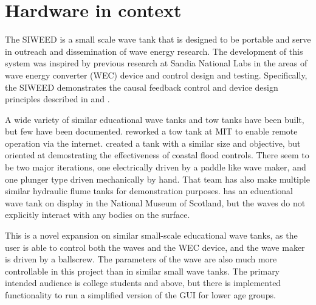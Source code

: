 \documentclass[11pt, letterpaper]{article}
\begin{document}
\section{Hardware in context} %
The SIWEED is a small scale wave tank that is designed to be portable and serve in outreach and dissemination of wave energy research.
The development of this system was inspired by previous research at Sandia National Labs in the areas of wave energy converter (WEC) device and control design and testing.
Specifically, the SIWEED demonstrates the causal feedback control and device design principles described in \citet{Bacelli2020} and \citet{Coe2020a}.


A wide variety of similar educational wave tanks and tow tanks have been built, but few have been documented.
\citet{unger2006creating} reworked a tow tank at MIT to enable remote operation via the internet.
\citet{Trust2015} created a tank with a similar size and objective, but oriented at demostrating the effectiveness of coastal flood controls.
There seem to be two major iterations, one electrically driven by a paddle like wave maker, and one plunger type driven mechanically by hand. 
That team has also make multiple similar hydraulic flume tanks for demonstration purposes.
\citet{Ivan2016} has an educational wave tank on display in the National Museum of Scotland, but the waves do not explicitly interact with any bodies on the surface. 

This is a novel expansion on similar small-scale educational wave tanks, as the user is able to control both the waves and the WEC device, and the wave maker is driven by a ballscrew.
The parameters of the wave are also much more controllable in this project than in similar small wave tanks.
The primary intended audience is college students and above, but there is implemented functionality to run a simplified version of the GUI for lower age groups.
\end{document}
